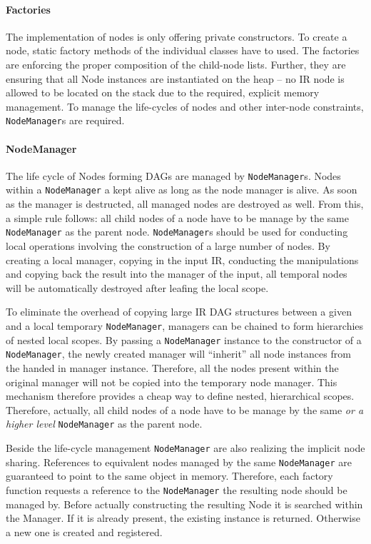 \paragraph{Factories}  \label{sec:Compiler.Core.NodesAndManagers.Factories}
The implementation of nodes is only offering private constructors. To create a
node, static factory methods of the individual classes have to used. The
factories are enforcing the proper composition of the child-node lists. Further,
they are ensuring that all Node instances are instantiated on the heap -- no IR
node is allowed to be located on the stack due to the required, explicit memory
management. To manage the life-cycles of nodes and other inter-node constraints,
\texttt{NodeManager}s are required.

\paragraph{NodeManager}  The life cycle of Nodes forming
DAGs are managed by \texttt{NodeManager}s. Nodes within a \texttt{NodeManager} a kept alive as
long as the node manager is alive. As soon as the manager is destructed, all
managed nodes are destroyed as well. From this, a simple rule follows: all child
nodes of a node have to be manage by the same \texttt{NodeManager} as the parent node.
\texttt{NodeManager}s should be used for conducting local operations involving the
construction of a large number of nodes. By creating a local manager, copying in
the input IR, conducting the manipulations and copying back the result into the
manager of the input, all temporal nodes will be automatically destroyed after
leafing the local scope.

To eliminate the overhead of copying large IR DAG structures between a given and
a local temporary \texttt{NodeManager}, managers can be chained to form hierarchies of
nested local scopes. By passing a \texttt{NodeManager} instance to the constructor of a
\texttt{NodeManager}, the newly created manager will ``inherit'' all node instances from
the handed in manager instance. Therefore, all the nodes present within the
original manager will not be copied into the temporary node manager. This
mechanism therefore provides a cheap way to define nested, hierarchical scopes.
Therefore, actually, all child nodes of a node have to be manage by the same
\textit{or a higher level} \texttt{NodeManager} as the parent node.

Beside the life-cycle management \texttt{NodeManager} are also realizing the implicit
node sharing. References to equivalent nodes managed by the same \texttt{NodeManager} are
guaranteed to point to the same object in memory. Therefore, each factory
function requests a reference to the \texttt{NodeManager} the resulting node should be
managed by. Before actually constructing the resulting Node it is searched
within the Manager. If it is already present, the existing instance is returned.
Otherwise a new one is created and registered.

